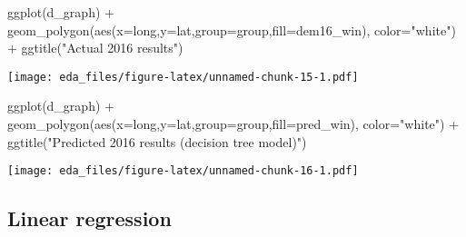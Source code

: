 \documentclass[
]{article}
\newenvironment{Shaded}{\begin{snugshade}}{\end{snugshade}}
\newcommand{\AttributeTok}[1]{\textcolor[rgb]{0.77,0.63,0.00}{#1}}
\newcommand{\FunctionTok}[1]{\textcolor[rgb]{0.00,0.00,0.00}{#1}}
\newcommand{\NormalTok}[1]{#1}
\newcommand{\SpecialCharTok}[1]{\textcolor[rgb]{0.00,0.00,0.00}{#1}}
\newcommand{\StringTok}[1]{\textcolor[rgb]{0.31,0.60,0.02}{#1}}
\begin{document}
\begin{Shaded}
\begin{Highlighting}[]
\FunctionTok{ggplot}\NormalTok{(d\_graph) }\SpecialCharTok{+}
    \FunctionTok{geom\_polygon}\NormalTok{(}\FunctionTok{aes}\NormalTok{(}\AttributeTok{x=}\NormalTok{long,}\AttributeTok{y=}\NormalTok{lat,}\AttributeTok{group=}\NormalTok{group,}\AttributeTok{fill=}\NormalTok{dem16\_win),}
                 \AttributeTok{color=}\StringTok{"white"}\NormalTok{) }\SpecialCharTok{+}
    \FunctionTok{ggtitle}\NormalTok{(}\StringTok{"Actual 2016 results"}\NormalTok{)}
\end{Highlighting}
\end{Shaded}

\texttt{[image: eda\_files/figure-latex/unnamed-chunk-15-1.pdf]}

\begin{Shaded}
\begin{Highlighting}[]
\FunctionTok{ggplot}\NormalTok{(d\_graph) }\SpecialCharTok{+}
    \FunctionTok{geom\_polygon}\NormalTok{(}\FunctionTok{aes}\NormalTok{(}\AttributeTok{x=}\NormalTok{long,}\AttributeTok{y=}\NormalTok{lat,}\AttributeTok{group=}\NormalTok{group,}\AttributeTok{fill=}\NormalTok{pred\_win),}
                 \AttributeTok{color=}\StringTok{"white"}\NormalTok{) }\SpecialCharTok{+}
    \FunctionTok{ggtitle}\NormalTok{(}\StringTok{"Predicted 2016 results (decision tree model)"}\NormalTok{)}
\end{Highlighting}
\end{Shaded}

\texttt{[image: eda\_files/figure-latex/unnamed-chunk-16-1.pdf]}

\hypertarget{linear-regression}{%
\subsection{Linear regression}\label{linear-regression}}
\end{document}
